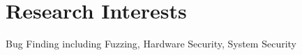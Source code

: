 \section*{Research Interests}
\begin{description}

\item Bug Finding including Fuzzing, Hardware Security, System Security
\end{description}
